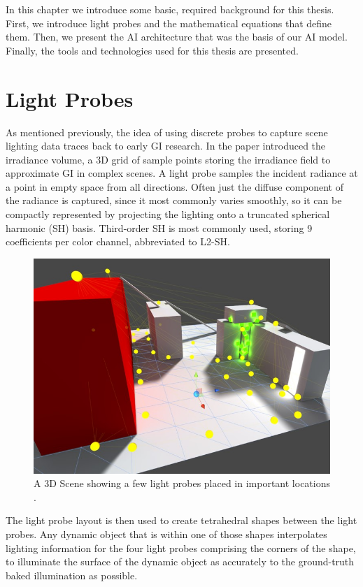 In this chapter we introduce some basic, required background for this thesis. First, we introduce light probes and the mathematical equations that define them. Then, we present the AI architecture that was the basis of our AI model. Finally, the tools and technologies used for this thesis are presented.

\section{Light Probes}
As mentioned previously, the idea of using discrete probes to capture scene lighting data traces back to early GI research. In the paper \parencite{Greger1998} introduced the irradiance volume, a 3D grid of sample points storing the irradiance field to approximate GI in complex scenes. A light probe samples the incident radiance at a point in empty space from all directions. Often just the diffuse component of the radiance is captured, since it most commonly varies smoothly, so it can be compactly represented by projecting the lighting onto a truncated spherical harmonic (SH) basis. Third-order SH is most commonly used, storing 9 coefficients per color channel, abbreviated to L2-SH.

\begin{figure}[h]
	\centering
	\includegraphics[scale=0.5]{Graphics/light_probes.jpg}
	\caption{A 3D Scene showing a few light probes placed in important locations \parencite{Unity2016}.}
	\label{fig:Light_probes}
\end{figure}

The light probe layout is then used to create tetrahedral shapes between the light probes. Any dynamic object that is within one of those shapes interpolates lighting information for the four light probes comprising the corners of the shape, to illuminate the surface of the dynamic object as accurately to the ground-truth baked illumination as possible.

